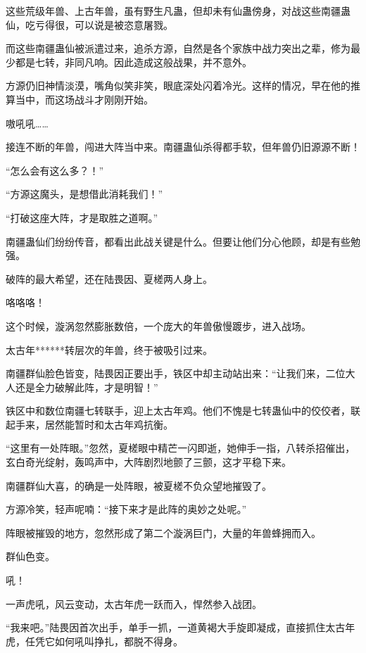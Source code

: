 \begin{this_body}
这些荒级年兽、上古年兽，虽有野生凡蛊，但却未有仙蛊傍身，对战这些南疆蛊仙，吃亏得很，可以说是被恣意屠戮。

而这些南疆蛊仙被派遣过来，追杀方源，自然是各个家族中战力突出之辈，修为最少都是七转，非同凡响。因此造成这般战果，并不意外。

方源仍旧神情淡漠，嘴角似笑非笑，眼底深处闪着冷光。这样的情况，早在他的推算当中，而这场战斗才刚刚开始。

嗷吼吼……

接连不断的年兽，闯进大阵当中来。南疆蛊仙杀得都手软，但年兽仍旧源源不断！

“怎么会有这么多？！”

“方源这魔头，是想借此消耗我们！”

“打破这座大阵，才是取胜之道啊。”

南疆蛊仙们纷纷传音，都看出此战关键是什么。但要让他们分心他顾，却是有些勉强。

破阵的最大希望，还在陆畏因、夏槎两人身上。

咯咯咯！

这个时候，漩涡忽然膨胀数倍，一个庞大的年兽傲慢踱步，进入战场。

太古年******转层次的年兽，终于被吸引过来。

南疆群仙脸色皆变，陆畏因正要出手，铁区中却主动站出来：“让我们来，二位大人还是全力破解此阵，才是明智！”

铁区中和数位南疆七转联手，迎上太古年鸡。他们不愧是七转蛊仙中的佼佼者，联起手来，居然能暂时和太古年鸡抗衡。

“这里有一处阵眼。”忽然，夏槎眼中精芒一闪即逝，她伸手一指，八转杀招催出，玄白奇光绽射，轰鸣声中，大阵剧烈地颤了三颤，这才平稳下来。

南疆群仙大喜，的确是一处阵眼，被夏槎不负众望地摧毁了。

方源冷笑，轻声呢喃：“接下来才是此阵的奥妙之处呢。”

阵眼被摧毁的地方，忽然形成了第二个漩涡巨门，大量的年兽蜂拥而入。

群仙色变。

吼！

一声虎吼，风云变动，太古年虎一跃而入，悍然参入战团。

“我来吧。”陆畏因首次出手，单手一抓，一道黄褐大手旋即凝成，直接抓住太古年虎，任凭它如何吼叫挣扎，都脱不得身。

\end{this_body}

